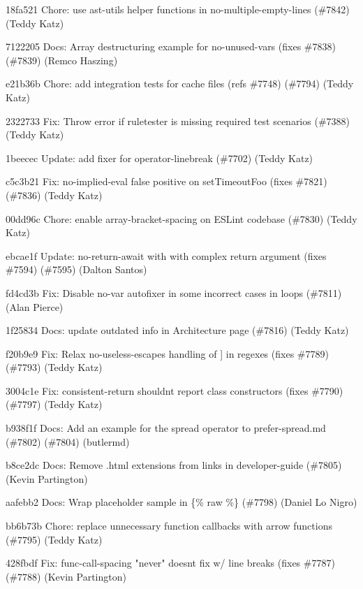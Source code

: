 \begin{DoxyItemize}
\item 18fa521 Chore\+: use ast-\/utils helper functions in no-\/multiple-\/empty-\/lines (\#7842) (Teddy Katz)
\item 7122205 Docs\+: Array destructuring example for no-\/unused-\/vars (fixes \#7838) (\#7839) (Remco Haszing)
\item e21b36b Chore\+: add integration tests for cache files (refs \#7748) (\#7794) (Teddy Katz)
\item 2322733 Fix\+: Throw error if ruletester is missing required test scenarios (\#7388) (Teddy Katz)
\item 1beecec Update\+: add fixer for {\ttfamily operator-\/linebreak} (\#7702) (Teddy Katz)
\item c5c3b21 Fix\+: no-\/implied-\/eval false positive on \textquotesingle{}set\+Timeout\+Foo\textquotesingle{} (fixes \#7821) (\#7836) (Teddy Katz)
\item 00dd96c Chore\+: enable array-\/bracket-\/spacing on ESLint codebase (\#7830) (Teddy Katz)
\item ebcae1f Update\+: no-\/return-\/await with with complex {\ttfamily return} argument (fixes \#7594) (\#7595) (Dalton Santos)
\item fd4cd3b Fix\+: Disable no-\/var autofixer in some incorrect cases in loops (\#7811) (Alan Pierce)
\item 1f25834 Docs\+: update outdated info in Architecture page (\#7816) (Teddy Katz)
\item f20b9e9 Fix\+: Relax no-\/useless-\/escape\textquotesingle{}s handling of \textquotesingle{}\mbox{]}\textquotesingle{} in regexes (fixes \#7789) (\#7793) (Teddy Katz)
\item 3004c1e Fix\+: consistent-\/return shouldn\textquotesingle{}t report class constructors (fixes \#7790) (\#7797) (Teddy Katz)
\item b938f1f Docs\+: Add an example for the spread operator to prefer-\/spread.\+md (\#7802) (\#7804) (butlermd)
\item b8ce2dc Docs\+: Remove .html extensions from links in developer-\/guide (\#7805) (Kevin Partington)
\item aafebb2 Docs\+: Wrap placeholder sample in \{\% raw \%\} (\#7798) (Daniel Lo Nigro)
\item bb6b73b Chore\+: replace unnecessary function callbacks with arrow functions (\#7795) (Teddy Katz)
\item 428fbdf Fix\+: func-\/call-\/spacing "{}never"{} doesn\textquotesingle{}t fix w/ line breaks (fixes \#7787) (\#7788) (Kevin Partington)

\end{DoxyItemize}
